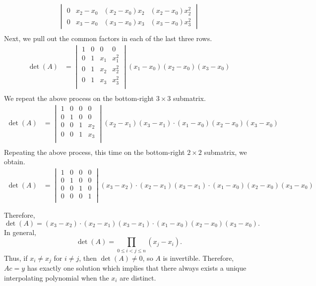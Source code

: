 \documentclass{report}
\begin{document}
\begin{itemize}
\begin{align*}
\begin{vmatrix}
    0 & x_2-x_0 & (x_2 - x_0)x_2 & (x_2 - x_0)x_2^2\\
    0 & x_3-x_0 & (x_3 - x_0)x_3 & (x_3 - x_0)x_3^2
\end{vmatrix} \\
    \end{align*}
    \bigbreak \noindent 
    Next, we pull out the common factors in each of the last three rows.
    \begin{align*}
        \det(A)
& = 
\begin{vmatrix}
    1 & 0 & 0 & 0 \\
    0 & 1 & x_1 & x_1^2\\
    0 & 1 & x_2 & x_2^2\\
    0 & 1 & x_3 & x_3^2\\
\end{vmatrix} (x_1-x_0)(x_2-x_0)(x_3-x_0) \\
    \end{align*}
    We repeat the above process on the bottom-right $3 \times 3$ submatrix.
    \begin{align*}
        \det(A)
& = 
\begin{vmatrix}
    1 & 0 & 0 & 0 \\
    0 & 1 & 0 & 0 \\
    0 & 0 & 1 & x_2\\
    0 & 0 & 1 & x_3\\
\end{vmatrix} (x_2-x_1)(x_3-x_1)\cdot(x_1-x_0)(x_2-x_0)(x_3-x_0) \\ 
    \end{align*}
    \bigbreak \noindent 
    Repeating the above process, this time on the bottom-right $2 \times 2$ submatrix, we obtain.
\begin{align*}
\det(A)
& = 
\begin{vmatrix}
1 & 0 & 0 & 0 \\
0 & 1 & 0 & 0 \\
0 & 0 & 1 & 0 \\
0 & 0 & 0 & 1 \\
\end{vmatrix} (x_3-x_2)\cdot(x_2-x_1)(x_3-x_1)\cdot(x_1-x_0)(x_2-x_0)(x_3-x_0) \\ \\
\end{align*}
Therefore, 
$$\det(A) = (x_3-x_2)\cdot(x_2-x_1)(x_3-x_1)\cdot(x_1-x_0)(x_2-x_0)(x_3-x_0).$$
\bigbreak \noindent 
In general,
$$\det(A) = \prod_{0\leq i < j \leq n} (x_j - x_i).$$
Thus, if $x_i \neq x_j$ for $i \neq j$, then $\det(A) \neq 0$, so $A$ is invertible. Therefore, $Ac = y$ has exactly one solution which implies that there always exists a unique interpolating polynomial when the $x_i$ are distinct.

\end{itemize}
\end{document}
